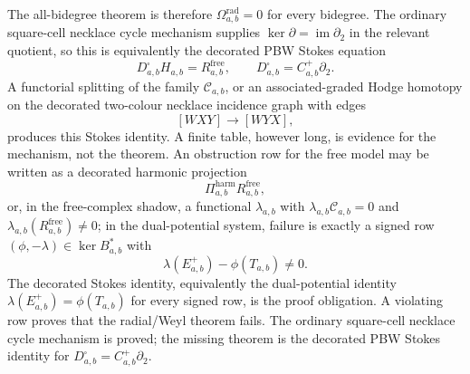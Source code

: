 \begin{enumerate}
  The all-bidegree theorem is therefore
  \(\Omega^{\mathrm{rad}}_{a,b}=0\) for every bidegree.  The ordinary
  square-cell necklace cycle mechanism supplies
  \(\ker\partial=\operatorname{im}\partial_2\) in the relevant quotient,
  so this is equivalently the decorated PBW Stokes equation
  \[
    D^\square_{a,b}H_{a,b}=R^{\mathrm{free}}_{a,b},
    \qquad
    D^\square_{a,b}=C^+_{a,b}\partial_2 .
  \]
  A functorial splitting of the family \(\mathcal C_{a,b}\), or an
  associated-graded Hodge homotopy on the decorated two-colour necklace
  incidence graph with edges
  \[
    [WXY]\longrightarrow[WYX],
  \]
  produces this Stokes identity.  A finite table, however long, is
  evidence for the mechanism, not the theorem.  An obstruction row for
  the free model may be written as a decorated harmonic projection
  \[
    \Pi^{\mathrm{harm}}_{a,b}R^{\mathrm{free}}_{a,b},
  \]
  or, in the free-complex shadow, a functional \(\lambda_{a,b}\) with
  \(\lambda_{a,b}\mathcal C_{a,b}=0\) and
  \(\lambda_{a,b}(R^{\mathrm{free}}_{a,b})\ne0\); in the dual-potential
  system, failure is exactly a signed row
  \((\phi,-\lambda)\in\ker B_{a,b}^*\) with
  \[
    \lambda(E^+_{a,b})-\phi(T_{a,b})\ne0.
  \]
  The decorated Stokes identity, equivalently the dual-potential
  identity \(\lambda(E^+_{a,b})=\phi(T_{a,b})\) for every signed row,
  is the proof obligation.  A violating row proves that the radial/Weyl
  theorem fails.  The ordinary square-cell necklace cycle mechanism is
  proved; the missing theorem is the decorated PBW Stokes identity for
  \(D^\square_{a,b}=C^+_{a,b}\partial_2\).


\end{enumerate}
